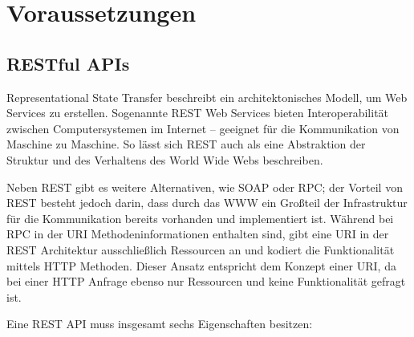 \chapter{Voraussetzungen}

	
	\section{RESTful APIs}	
	
		Representational State Transfer beschreibt ein architektonisches Modell, um Web Services zu erstellen. Sogenannte REST Web Services bieten Interoperabilität zwischen Computersystemen im Internet -- geeignet für die Kommunikation von Maschine zu Maschine. So lässt sich REST auch als eine Abstraktion der Struktur und des Verhaltens des World Wide Webs beschreiben. 
		
		Neben REST gibt es weitere Alternativen, wie SOAP oder RPC; der Vorteil von REST besteht jedoch darin, dass durch das WWW ein Großteil der Infrastruktur für die Kommunikation bereits vorhanden und implementiert ist. Während bei RPC in der URI Methodeninformationen enthalten sind, gibt eine URI in der REST Architektur ausschließlich Ressourcen an und kodiert die Funktionalität mittels HTTP Methoden. Dieser Ansatz entspricht dem Konzept einer URI, da bei einer HTTP Anfrage ebenso nur Ressourcen und keine Funktionalität gefragt ist.
		
		Eine REST API muss insgesamt sechs Eigenschaften besitzen:
		
